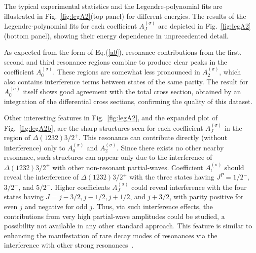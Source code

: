 \documentclass[prc,reprint,onecolumn,amsmath,amssymb,superscriptaddress]{revtex4-1}
\begin{document}

The typical experimental statistics and the Legendre-polynomial 
fits are illustrated in Fig.~\ref{fig:legA2}(top panel) for 
different energies.  The results of the Legendre-polynomial fits 
for each coefficient $A^{(\sigma)}_J$ are depicted in 
Fig.~\ref{fig:legA2}(bottom panel), showing their energy 
dependence in unprecedented detail. 

As expected from the form of Eq.(\ref{a0}), resonance contributions
from the first, second and third resonance regions combine to
produce clear peaks in the coefficient $A^{(\sigma)}_0$.
These regions are somewhat less pronounced in $A^{(\sigma)}_2$, which
also contains interference terms between states of the same parity.
The result for $A^{(\sigma)}_0$ itself shows 
good agreement with the total cross section, 
obtained by an integration of the differential cross sections, 
confirming the quality of this dataset.

Other interesting features in Fig.~\ref{fig:legA2}, and the expanded
plot of Fig.~\ref{fig:legA2b}, are the sharp structures seen for each 
coefficient $A^{(\sigma)}_J$ in the region of $\Delta(1232)3/2^+$.  
This resonance can contribute directly (without interference) only to 
$A^{(\sigma)}_0$ and $A^{(\sigma)}_2$. Since there exists no other 
nearby resonance, such structures can appear only due to the 
interference of $\Delta(1232)3/2^+$ with other non-resonant 
partial-waves. Coefficient $A^{(\sigma)}_1$ should reveal the 
interference of $\Delta(1232)3/2^+$ with the three states having 
$J^P = 1/2^-$, $3/2^-$, and $5/2^-$. Higher coefficients 
$A^{(\sigma)}_J$ could reveal interference with the four states 
having $J = j - 3/2, j - 1/2, j + 1/2$, and $j + 3/2$, with parity 
positive for even $j$ and negative for odd $j$. Thus, via such 
interference effects, the contributions from very high partial-wave 
amplitudes could be studied, a possibility not available in any 
other standard approach. This feature is similar to enhancing the
manifestation of rare decay modes of resonances via the interference 
with other strong resonances~\cite{YaA}.
\end{document}
